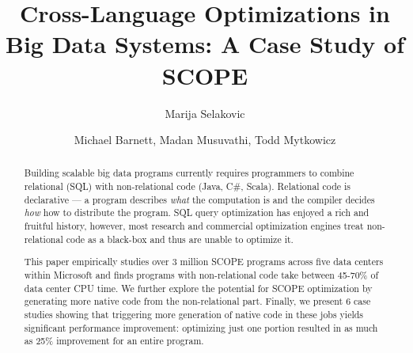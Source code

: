 \documentclass[sigconf]{acmart}
\begin{document}


\title{Cross-Language Optimizations in Big Data Systems: A Case Study of SCOPE}



\author{Marija Selakovic}


\author{Michael Barnett, Madan Musuvathi, Todd Mytkowicz}




\renewcommand{\shortauthors}{M. Selakovic et al.}


\begin{abstract}

  Building scalable big data programs currently requires programmers to combine relational (SQL) with non-relational code (Java, C\#, Scala).
  Relational code is declarative --- a program describes \emph{what} the computation is and the compiler decides \emph{how} how to distribute the program.  SQL query optimization has enjoyed a rich and fruitful history, however, most research and commercial optimization engines treat non-relational code as a black-box and thus are unable to optimize it.

  This paper empirically studies over 3 million SCOPE programs across five data centers within Microsoft and finds programs with non-relational code take between 45-70\% of data center CPU time.
  We further explore the potential for SCOPE optimization by generating more native code from the non-relational part. Finally, we present 6 case studies showing that triggering more generation of native code in these jobs yields significant performance improvement: optimizing just one portion resulted in as much as 25\% improvement for an entire program.

\end{abstract}

%
%
\end{document}
